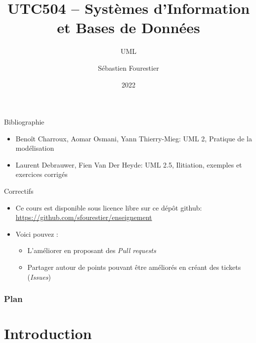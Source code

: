 \documentclass[14pt]{beamer}
\title{UTC504 -- Systèmes d'Information et Bases de Données}
\subtitle{UML}
\author{Sébastien Fourestier}
\date{2022}
\begin{document}
\frame{\titlepage}

\begin{framentitle}{Bibliographie}
    \begin{itemize}
        \item Benoît Charroux, Aomar Osmani, Yann Thierry-Mieg: UML 2, Pratique
            de la modélisation  %
        \item Laurent Debrauwer, Fien Van Der Heyde: UML 2.5, Ilitiation,
            exemples et exercices corrigés
    \end{itemize}
\end{framentitle}

\begin{framentitle}{Correctifs}
    \begin{itemize}
        \item Ce cours est disponible sous licence libre sur ce dépôt github:\\
            \small{\url{https://github.com/sfourestier/enseignement}}
        \item[\ra] Voici pouvez :
            \begin{itemize}
                \item L'améliorer en proposant des \emph{Pull requests}
                \item Partager autour de points pouvant être améliorés en créant des
                    tickets (\emph{Issues})
            \end{itemize}
    \end{itemize}
\end{framentitle}

\begin{frame}
    \frametitle{Plan}
    \tableofcontents
\end{frame}


\section{Introduction}
\end{document}
